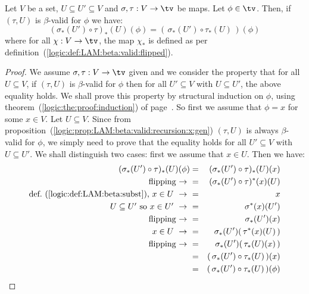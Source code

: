 \begin{prop}\label{logic:prop:LAM:beta:valid:composition:gen}
    Let $V$ be a set, $U\subseteq U' \subseteq V$ and $\sigma,\tau:V\to\tv$ 
    be maps. Let $\phi\in\tv$. Then, if $(\tau,U)$ is $\beta$-valid for $\phi$ 
    we have:
        \[
            (\sigma_{*}(U')\circ\tau)_{*}(U)(\phi)
            =(\,\sigma_{*}(U')\circ\tau_{*}(U)\,)(\phi)
        \]
    where for all $\chi:V\to\tv$, the map $\chi_{*}$ is defined
    as per definition~(\ref{logic:def:LAM:beta:valid:flipped}).
\end{prop}
\begin{proof}
    We assume $\sigma,\tau:V\to\tv$ given and we consider the property
    that for all $U\subseteq V$, if $(\tau, U)$ is $\beta$-valid for $\phi$
    then for all $U'\subseteq V$ with $U\subseteq U'$, the above equality
    holds. We shall prove this property by structural induction on $\phi$, 
    using theorem~(\ref{logic:the:proof:induction})
    of page~\pageref{logic:the:proof:induction}. So first we assume that 
    $\phi=x$ for some $x\in V$. Let $U\subseteq V$. Since from 
    proposition~(\ref{logic:prop:LAM:beta:valid:recursion:x:gen}) $(\tau,U)$ 
    is always $\beta$-valid for $\phi$, we simply need to prove that the 
    equality holds for all $U'\subseteq V$ with $U\subseteq U'$. We shall 
    distinguish two cases: first we assume that $x\in U$. Then we have:
        \begin{eqnarray*}(\sigma_{*}(U')\circ\tau)_{*}(U)(\phi)
            &=&(\sigma_{*}(U')\circ\tau)_{*}(U)(x)\\
            \mbox{flipping\ $\to$\ }
            &=&(\sigma_{*}(U')\circ\tau)^{*}(x)(U)\\
            \mbox{def.~(\ref{logic:def:LAM:beta:subst}), $x\in U\ \to\ $}
            &=&x\\
            \mbox{$U\subseteq U'$ so $x\in U'\ \to\ $}
            &=&\sigma^{*}(x)(U')\\
            \mbox{flipping\ $\to$\ }
            &=&\sigma_{*}(U')(x)\\
            \mbox{$x\in U\ \to\ $}
            &=&\sigma_{*}(U')(\,\tau^{*}(x)(U)\,)\\
            \mbox{flipping\ $\to$\ }
            &=&\sigma_{*}(U')(\,\tau_{*}(U)(x)\,)\\
            &=&(\,\sigma_{*}(U')\circ \tau_{*}(U)\,)(x)\\
            &=&(\,\sigma_{*}(U')\circ \tau_{*}(U)\,)(\phi)
        \end{eqnarray*}
    \noindent

\end{proof}
